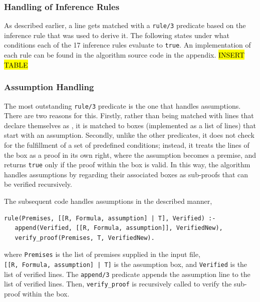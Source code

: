 \documentclass[a4paper, 11pt]{article}
\begin{document}
   \subsubsection{Handling of Inference Rules}
   \label{handling-of-inference-rules}

   As described earlier, a line gets matched with a 
   \texttt{rule/3} predicate based on the inference rule that 
   was used to derive it. The following states under what
   conditions each of the 17 inference rules evaluate to
   \texttt{true}. An implementation of each rule can be found
   in the algorithm source code in the appendix.
   \bigbreak
   \hl{INSERT TABLE}

   \subsubsection{Assumption Handling}
   \label{assumption-handling}
   The most outstanding \texttt{rule/3} predicate is the one
   that handles assumptions. There are two reasons for this.
   Firstly, rather than being matched with lines that declare
   themselves as , it is matched to
   boxes (implemented as a list of lines) that start with an 
   assumption. Secondly, unlike the other predicates, it does
   not check for the fulfillment of a set of predefined
   conditions; instead, it treats the lines of the box as a
   proof in its own right, where the assumption becomes a
   premise, and returns \texttt{true} only if the proof within
   the box is valid. In this way, the algorithm handles
   assumptions by regarding their associated boxes as 
   sub-proofs that can be verified recursively.
   \bigbreak

   The subsequent code handles assumptions in the described
   manner,

\begin{verbatim}
rule(Premises, [[R, Formula, assumption] | T], Verified) :-
   append(Verified, [[R, Formula, assumption]], VerifiedNew),
   verify_proof(Premises, T, VerifiedNew).
\end{verbatim}
   
   where \texttt{Premises} is the list of premises supplied 
   in the input file, \\ 
   \texttt{[[R, Formula, assumption] | T]} is the assumption
   box, and \texttt{Verified} is the list of verified lines.
   The \texttt{append/3} predicate appends the assumption line
   to the list of verified lines. Then, \texttt{verify\_proof}
   is recursively called to verify the sub-proof within the
   box.
\end{document}
